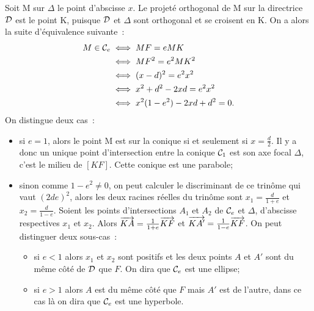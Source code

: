 Soit M sur $\Delta$ le point d'abscisse $x$. Le projeté orthogonal de M sur la directrice $\mathcal{D}$ est le point K, puisque $\mathcal{D}$ et $\Delta$ sont orthogonal et se croisent en K. On a alors la suite d'équivalence suivante~:
\begin{align}
  M \in \mathcal{C}_{e} &\iff MF = e MK \\
  &\iff MF^2=e^2 MK^2 \\
  &\iff (x-d)^2=e^2 x^2\\
  &\iff x^2+d^2-2xd=e^2 x^2\\
  &\iff x^2(1-e^2)-2xd+d^2=0.
\end{align}
On distingue deux cas~:
\begin{itemize}
\item si $e=1$, alors le point M est sur la conique si et seulement si $x=\frac{d}{2}$. Il y a donc un unique point d'intersection entre la conique $\mathcal{C}_{1}$ est son axe focal $\Delta$, c'est le milieu de $[KF]$. Cette conique est une parabole;
\item sinon comme $1-e^2 \neq 0$, on peut calculer le discriminant de ce trinôme qui vaut $(2de)^2$, alors les deux racines réelles du trinôme sont $x_1=\frac{d}{1+e}$ et $x_2=\frac{d}{1-e}$. Soient les points d'intersections $A_1$ et $A_2$ de $\mathcal{C}_{e}$ et $\Delta$, d'abscisse respectives $x_1$ et $x_2$. Alors $\overrightarrow{KA}=\frac{1}{1+e} \overrightarrow{KF}$ et $\overrightarrow{KA'}=\frac{1}{1-e} \overrightarrow{KF}$. On peut distinguer deux sous-cas~:
  \begin{itemize}
  \item si $e<1$ alors $x_1$ et $x_2$ sont positifs et les deux points $A$ et $A'$ sont du même côté de $\mathcal{D}$ que $F$. On dira que $\mathcal{C}_{e}$ est une ellipse;
  \item si $e>1$ alors $A$ est du même côté que $F$ mais $A'$ est de l'autre, dans ce cas là on dira que $\mathcal{C}_{e}$ est une hyperbole.
  \end{itemize}
\end{itemize}

